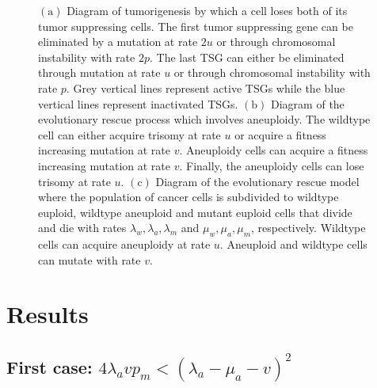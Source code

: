 \documentclass[12pt]{extarticle}
\begin{document}
\begin{figure}
\caption{$\left(\text{a}\right)$ Diagram of tumorigenesis by which a cell loses both of its tumor suppressing cells. The first tumor suppressing gene can be eliminated by a mutation at rate $2u$ or through chromosomal instability with rate $2p$. The last TSG can either be eliminated through mutation at rate $u$ or through chromosomal instability with rate $p$. Grey vertical lines represent active TSGs while the blue vertical lines represent inactivated TSGs. $\left(\text{b}\right)$ Diagram of the evolutionary rescue process which involves aneuploidy. The wildtype cell can either acquire trisomy at rate $u$ or acquire a fitness increasing mutation at rate $v$. Aneuploidy cells can  acquire a fitness increasing mutation at rate $v$. Finally, the aneuploidy cells can lose trisomy at rate $u$. $\left(\text{c}\right)$ Diagram of the evolutionary rescue model where the population of cancer cells is subdivided to wildtype euploid, wildtype aneuploid and mutant euploid cells that divide and die with rates $\lambda_w,  \lambda_a,  \lambda_m$ and $\mu_w, \mu_a, \mu_m$, respectively. Wildtype cells can acquire aneuploidy at rate $u$. Aneuploid and wildtype cells can mutate with rate $v$.}
\end{figure}


\section*{Results}


\subsection*{First case: $4\lambda_avp_m<\left(\lambda_a-\mu_a-v\right)^2$}
\end{document}
